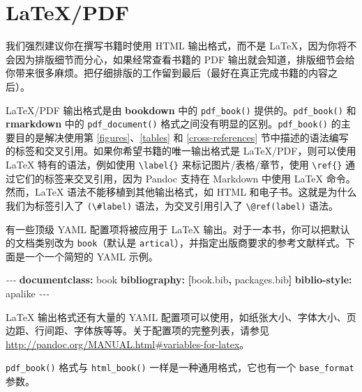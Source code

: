 \documentclass[
  12pt,
]{krantz}
\newenvironment{Shaded}{\begin{snugshade}}{\end{snugshade}}
\newcommand{\AttributeTok}[1]{\textcolor[rgb]{0.13,0.29,0.53}{#1}}
\newcommand{\FunctionTok}[1]{\textcolor[rgb]{0.13,0.29,0.53}{\textbf{#1}}}
\newcommand{\KeywordTok}[1]{\textcolor[rgb]{0.13,0.29,0.53}{\textbf{#1}}}
\newcommand{\PreprocessorTok}[1]{\textcolor[rgb]{0.56,0.35,0.01}{\textit{#1}}}
\theoremstyle{definition}
\theoremstyle{definition}
\theoremstyle{definition}
\theoremstyle{definition}
\theoremstyle{remark}
\begin{document}
\hypertarget{latexpdf}{%
\section{LaTeX/PDF}\label{latexpdf}}

我们强烈建议你在撰写书籍时使用 HTML 输出格式，而不是 LaTeX，因为你将不会因为排版细节而分心，如果经常查看书籍的 PDF 输出就会知道，排版细节会给你带来很多麻烦。把仔细排版的工作留到最后（最好在真正完成书籍的内容之后）。

LaTeX/PDF 输出格式是由 \textbf{bookdown} 中的 \texttt{pdf\_book()} 提供的。\texttt{pdf\_book()} 和 \textbf{rmarkdown} 中的 \texttt{pdf\_document()} 格式之间没有明显的区别。\texttt{pdf\_book()} 的主要目的是解决使用第 \ref{figures}、\ref{tables} 和 \ref{cross-references} 节中描述的语法编写的标签和交叉引用。如果你希望书籍的唯一输出格式是 LaTeX/PDF，则可以使用 LaTeX 特有的语法，例如使用 \texttt{\textbackslash{}label\{\}} 来标记图片/表格/章节，使用 \texttt{\textbackslash{}ref\{\}} 通过它们的标签来交叉引用，因为 Pandoc 支持在 Markdown 中使用 LaTeX 命令。然而，LaTeX 语法不能移植到其他输出格式，如 HTML 和电子书。这就是为什么我们为标签引入了 \texttt{(\textbackslash{}\#label)} 语法，为交叉引用引入了 \texttt{\textbackslash{}@ref(label)} 语法。

有一些顶级 YAML 配置项将被应用于 LaTeX 输出。对于一本书，你可以把默认的文档类别改为 \texttt{book}（默认是 \texttt{artical}），并指定出版商要求的参考文献样式。下面是一个一个简短的 YAML 示例。

\begin{Shaded}
\begin{Highlighting}[]
\PreprocessorTok{{-}{-}{-}}
\FunctionTok{documentclass}\KeywordTok{:}\AttributeTok{ book}
\FunctionTok{bibliography}\KeywordTok{:}\AttributeTok{ }\KeywordTok{[}\AttributeTok{book.bib}\KeywordTok{,}\AttributeTok{ packages.bib}\KeywordTok{]}
\FunctionTok{biblio{-}style}\KeywordTok{:}\AttributeTok{ apalike}
\PreprocessorTok{{-}{-}{-}}
\end{Highlighting}
\end{Shaded}

LaTeX 输出格式还有大量的 YAML 配置项可以使用，如纸张大小、字体大小、页边距、行间距、字体族等等。关于配置项的完整列表，请参见 \url{http://pandoc.org/MANUAL.html\#variables-for-latex}。

\texttt{pdf\_book()} 格式与 \texttt{html\_book()} 一样是一种通用格式，它也有一个 \texttt{base\_format} 参数。
\end{document}
